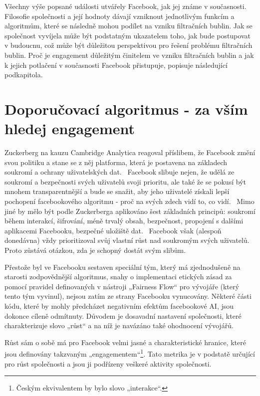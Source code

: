     Všechny výše popsané události utvářely Facebook, jak jej známe v současnosti. Filosofie společnosti a její hodnoty dávají vzniknout jednotlivým funkcím a algoritmům, které se následně mohou podílet na vzniku filtračních bublin. Jak se společnost vyvíjela může být podstatným ukazatelem toho, jak bude postupovat v budoucnu, což může být důležitou perspektivou pro řešení problému filtračních bublin. Proč je engagement důležitým činitelem ve vzniku filtračních bublin a jak k jejich potlačení v současnosti Facebook přistupuje, popisuje následující podkapitola.
    
    \setlength\parskip{0mm}
\section{Doporučovací algoritmus - za vším hledej engagement}
\label{sec:doporucovaci-algoritmus-engagement}
 
    Zuckerberg na kauzu Cambridge Analytica reagoval příslibem, že Facebook změní svou politiku a stane se z něj platforma, která je postavena na základech soukromí a ochrany uživatelských dat.~\citep{shaban_2019} Facebook slibuje nejen, že udělá ze soukromí a bezpečnosti svých uživatelů svoji prioritu, ale také že se pokusí být mnohem transparentnější a bude se snažit, aby jeho uživatelé získali lepší pochopení facebookového algoritmu - proč na svých zdech vidí to, co vidí.~\citep{satterfield_2020} Mimo jiné by mělo být podle Zuckerberga aplikováno šest základních principů: soukromí během interakcí, šifrování, méně trvalý obsah, bezpečnost, propojení s dalšími aplikacemi Facebooku, bezpečné uložiště dat.~\citep{zuckerberg_2021} Facebook však (alespoň donedávna) vždy prioritizoval svůj vlastní růst nad soukromým svých uživatelů. Proto zůstává otázkou, zda je schopný dostát svým slibům.~\citep{lapowsky_2019}
    
    Přestože byl ve Facebooku sestaven speciální tým, který má zjednodušeně na starosti zodpovědnější algoritmus, snahy o implementaci etických zásad za pomocí pravidel definovaných v nástroji „Fairness Flow“ pro vývojáře (který tento tým vyvinul), nejsou zatím ze strany Facebooku vynucovány. Některé části kódu, které by mohly předcházet negativním efektům facebookové AI, jsou dokonce cíleně odmítnuty. Důvodem je dosavadní nastavení společnosti, které charakterizuje slovo „růst“ a na níž je navázáno také ohodnocení vývojářů. 
    
    
    Růst sám o sobě má pro Facebook velmi jasné a charakteristické hranice, které jsou definovány takzvaným „engagementem“\footnote{Českým ekvivalentem by bylo slovo „interakce“.}. Tato metrika je v podstatě určující pro růst společnosti a jsou ji podřízeny veškeré aktivity společnosti.~\citep{hao_2021}
    
